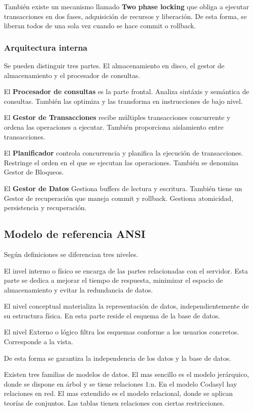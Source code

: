         También existe un mecanismo llamado \textbf{Two phase locking} que obliga a ejecutar transacciones en dos fases, adquisición de recursos y liberación. De esta forma, se liberan todos de una sola vez cuando se hace commit o rollback.

    \subsubsection{Arquitectura interna}
        Se pueden distinguir tres partes. El almacenamiento en disco, el gestor de almacenamiento y el procesador de consultas. 

        El \textbf{Procesador de consultas} es la parte frontal. Analiza sintáxis y semántica de consultas. También las optimiza y las transforma en instrucciones de bajo nivel.

        El \textbf{Gestor de Transacciones} recibe múltiples transacciones concurrente y ordena las operaciones a ejecutar. También proporciona aislamiento entre transacciones.

        El \textbf{Planificador} controla concurrencia y planifica la ejecución de transacciones. Restringe el orden en el que se ejecutan las operaciones. También se denomina Gestor de Bloqueos.

        El \textbf{Gestor de Datos} Gestiona buffers de lectura y escritura. También tiene un Gestor de recuperación que maneja commit y rollback. Gestiona atomicidad, persistencia y recuperación.

\subsection{Modelo de referencia ANSI}
    Según definiciones se diferencian tres niveles.

    El invel interno o físico se encarga de las partes relacionadas con el servidor. Esta parte se dedica a mejorar el tiempo de respuesta, minimizar el espacio de almacenamiento y evitar la redundancia de datos.

    El nivel conceptual materializa la representación de datos, independientemente de su estructura física. En esta parte reside el esquema de la base de datos.

    El nivel Externo o lógico filtra los esquemas conforme a los usuarios concretos. Corresponde a la vista.

    De esta forma se garantiza la independencia de los datos y la base de datos.

    Existen tres familias de modelos de datos. El mas sencillo es el modelo jerárquico, donde se dispone en árbol y se tiene relaciones 1:n. En el modelo Codasyl hay relaciones en red. El mas extendido es el modelo relacional, donde se aplican teorías de conjuntos. Las tablas tienen relaciones con ciertas restricciones.


